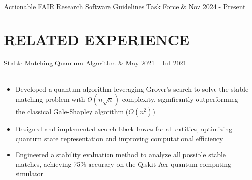 \documentclass[letterpaper,11pt]{article} %
\newcommand{\resumeItem}[1]{\small{#1}\vspace{-5pt}}
\begin{document}
\vspace{5pt}
\begin{tabular*}
    \vspace{1pt}\\
    {Actionable FAIR Research Software Guidelines Task Force} & {\color{TextBlack} \small Nov 2024 - Present}\\
\end{tabular*}

\section{RELATED EXPERIENCE}\label{related-experience}

\begin{tabular*}
    \uline{\href{https://github.com/hykelvinlee42/quantum-stable-matching}{Stable Matching Quantum Algorithm}} & {\color{TextBlack}\small May 2021 - Jul 2021}\vspace{1pt}\\
    \\
\end{tabular*}
\vspace{-5pt}
\begin{itemize}\vspace{-5pt}
    \item\resumeItem{Developed a quantum algorithm leveraging Grover’s search to solve the stable matching problem with $O(n\sqrt{n})$ complexity, significantly outperforming the classical Gale-Shapley algorithm ($O(n^2)$)}
    \item\resumeItem{Designed and implemented search black boxes for all entities, optimizing quantum state representation and improving computational efficiency}
    \item\resumeItem{Engineered a stability evaluation method to analyze all possible stable matches, achieving 75\% accuracy on the Qiskit Aer quantum computing simulator}
\end{itemize}
\end{document}
